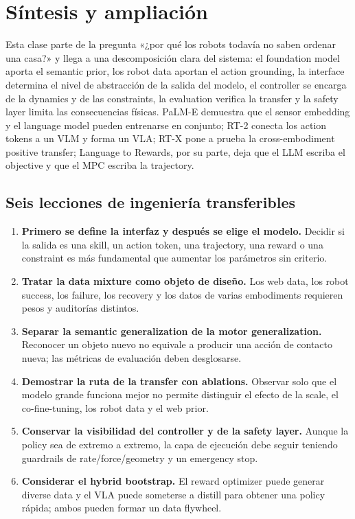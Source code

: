\section{Síntesis y ampliación}

Esta clase parte de la pregunta «¿por qué los robots todavía no saben ordenar una casa?» y llega a una descomposición clara del sistema: el foundation model aporta el semantic prior, los robot data aportan el action grounding, la interface determina el nivel de abstracción de la salida del modelo, el controller se encarga de la dynamics y de las constraints, la evaluation verifica la transfer y la safety layer limita las consecuencias físicas. PaLM-E demuestra que el sensor embedding y el language model pueden entrenarse en conjunto; RT-2 conecta los action tokens a un VLM y forma un VLA; RT-X pone a prueba la cross-embodiment positive transfer; Language to Rewards, por su parte, deja que el LLM escriba el objective y que el MPC escriba la trajectory.

\subsection{Seis lecciones de ingeniería transferibles}

\begin{enumerate}
  \item \textbf{Primero se define la interfaz y después se elige el modelo.} Decidir si la salida es una skill, un action token, una trajectory, una reward o una constraint es más fundamental que aumentar los parámetros sin criterio.
  \item \textbf{Tratar la data mixture como objeto de diseño.} Los web data, los robot success, los failure, los recovery y los datos de varias embodiments requieren pesos y auditorías distintos.
  \item \textbf{Separar la semantic generalization de la motor generalization.} Reconocer un objeto nuevo no equivale a producir una acción de contacto nueva; las métricas de evaluación deben desglosarse.
  \item \textbf{Demostrar la ruta de la transfer con ablations.} Observar solo que el modelo grande funciona mejor no permite distinguir el efecto de la scale, el co-fine-tuning, los robot data y el web prior.
  \item \textbf{Conservar la visibilidad del controller y de la safety layer.} Aunque la policy sea de extremo a extremo, la capa de ejecución debe seguir teniendo guardrails de rate/force/geometry y un emergency stop.
  \item \textbf{Considerar el hybrid bootstrap.} El reward optimizer puede generar diverse data y el VLA puede someterse a distill para obtener una policy rápida; ambos pueden formar un data flywheel.
\end{enumerate}

